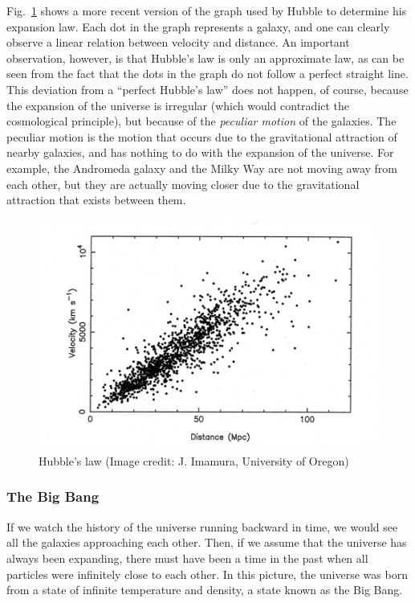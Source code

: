 Fig.\ \ref{fig:lec4_9} shows a more recent version of the graph used by Hubble to determine his expansion law. Each dot in the graph represents a galaxy, and one can clearly observe a linear relation between velocity and distance. An important observation, however, is that Hubble's law is only an approximate law, as can be seen from the fact that the dots in the graph do not follow a perfect straight line. This deviation from a ``perfect Hubble's law'' does not happen, of course, because the expansion of the universe is irregular (which would contradict the cosmological principle), but because of the {\it peculiar motion} of the galaxies. The peculiar motion is the motion that occurs due to the gravitational attraction of nearby galaxies, and has nothing to do with the expansion of the universe. For example, the Andromeda galaxy and the Milky Way are not moving away from each other, but they are actually moving closer due to the gravitational attraction that exists between them.
\begin{figure}[ht]
\begin{center}
\includegraphics[scale=0.4]{Draw/lec4_9.png}
\end{center}
\caption{Hubble's law (Image credit: J. Imamura, University of Oregon)}
\label{fig:lec4_9}
\end{figure}

\subsubsection{The Big Bang}

If we watch the history of the universe running backward in time, we would see all the galaxies approaching each other. Then, if we assume that the universe has always been expanding, there must have been a time in the past when all particles were infinitely close to each other. In this picture, the universe was born from a state of infinite temperature and density, a state known as the Big Bang.

